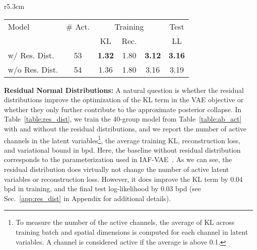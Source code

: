 \documentclass{article}
\begin{document}
\begin{wraptable}{r}{5.3cm}
\vspace{-4mm}
\centering
{\footnotesize
\setlength{\tabcolsep}{1pt}
\caption{\small The impact of residual dist.}\label{table:res_dist}
    \begin{tabular}{lccccc}
    \toprule
    Model    & \# Act. & \multicolumn{3}{c}{Training} & Test\\
             &      &  KL & Rec. &  & LL\\
    \midrule
    w/ Res. Dist.  & 53   &\bf 1.32  & 1.80  & \bf 3.12 & \bf 3.16 \\
    w/o Res. Dist.     & 54   & 1.36  & 1.80  & 3.16 & 3.19 \\
    \bottomrule
    \end{tabular}
}
\vspace{-4mm}
\end{wraptable}\textbf{Residual Normal Distributions:} A natural question is whether the residual distributions improve the optimization of the KL term in the VAE objective or whether they only further contribute to the approximate posterior collapse. In Table~\ref{table:res_dist}, we train the 40-group model from Table~\ref{table:ab_act} with and without the residual distributions, and we report the number of active channels in the latent variables\footnote{To measure the number of the active channels, the average of KL across training batch and spatial dimensions is computed for each channel in latent variables. A channel is considered active if the average is above 0.1.}, the average training KL, reconstruction loss, and variational bound in bpd. Here, the baseline without residual distribution corresponds to the parameterization used in IAF-VAE~\cite{kingma2016improved}. As we can see, the residual distribution does virtually not change the number of active latent variables or reconstruction loss. However, it does improve the KL term by 0.04 bpd in training, and the final test log-likelihood by 0.03 bpd (see Sec.~\ref{app:res_dist} in Appendix for additional details).
\end{document}
